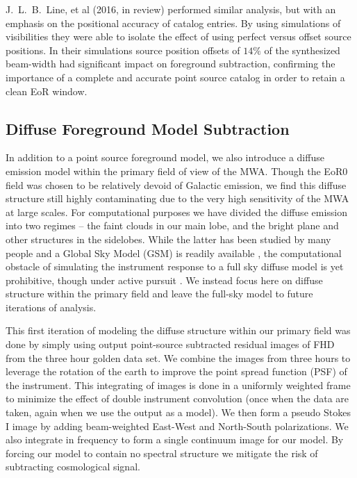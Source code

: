 \documentclass[iop]{emulateapj}
\begin{document}
J.~L.~B.~Line, et al (2016, in review) performed similar analysis, but with an emphasis on the
positional accuracy of catalog entries. By using simulations of visibilities they were able to 
isolate the effect of using perfect versus offset source positions. In their simulations source 
position offsets of $14\%$ of the synthesized
beam-width had significant impact on foreground subtraction, confirming the
importance of a complete and accurate point source catalog in order to retain a clean EoR
window.

\subsection{Diffuse Foreground Model Subtraction}

In addition to a point source foreground model, we also introduce a diffuse emission model 
within the primary field of view of the MWA. Though the EoR0 field was chosen to be 
relatively devoid of Galactic emission, we find this diffuse structure still highly contaminating 
due to the very high sensitivity of the MWA at large scales. For computational purposes we 
have divided the diffuse emission into two regimes -- the faint clouds in our main lobe, and 
the bright plane and other structures in the sidelobes. While the latter has been studied by 
many people and a Global Sky Model (GSM) is readily available 
\citep{deOliveira-Costa:2008}, the computational obstacle of simulating the instrument 
response to a full sky diffuse model is yet prohibitive, though under active pursuit 
\citep{Thyagarajan:2015}. We instead focus here on diffuse structure within the primary field 
and leave the full-sky model to future iterations of analysis.

This first iteration of modeling the diffuse structure within our primary field was done by 
simply using output point-source subtracted residual images of FHD from the three hour 
golden data set. We combine the images from three hours to leverage the rotation of the 
earth to improve the point spread function (PSF) of the instrument. This integrating of 
images is done in a uniformly weighted frame to minimize the effect of double instrument 
convolution (once when the data are taken, again when we use the output as a model). We 
then form a pseudo Stokes I image by adding beam-weighted East-West and North-South 
polarizations. We also integrate in frequency to form a single continuum image for our 
model. By forcing our model to contain no spectral structure we mitigate the risk of 
subtracting cosmological signal. 
\end{document}
